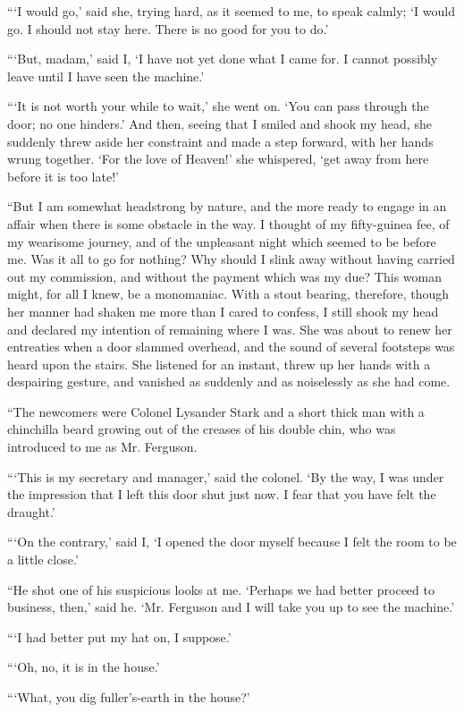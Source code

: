 \documentclass{article}
\begin{document}
```I would go,' said she, trying hard, as it seemed to me, to speak
calmly; `I would go. I should not stay here. There is no good for you
to do.'

```But, madam,' said I, `I have not yet done what I came for. I cannot
possibly leave until I have seen the machine.'

```It is not worth your while to wait,' she went on. `You can pass through
the door; no one hinders.' And then, seeing that I smiled and shook my
head, she suddenly threw aside her constraint and made a step forward,
with her hands wrung together. `For the love of Heaven!' she whispered,
`get away from here before it is too late!'

``But I am somewhat headstrong by nature, and the more ready to engage
in an affair when there is some obstacle in the way. I thought of my
fifty-guinea fee, of my wearisome journey, and of the unpleasant night
which seemed to be before me. Was it all to go for nothing? Why should
I slink away without having carried out my commission, and without
the payment which was my due? This woman might, for all I knew,
be a monomaniac. With a stout bearing, therefore, though her manner
had shaken me more than I cared to confess, I still shook my head and
declared my intention of remaining where I was. She was about to renew
her entreaties when a door slammed overhead, and the sound of several
footsteps was heard upon the stairs. She listened for an instant, threw
up her hands with a despairing gesture, and vanished as suddenly and as
noiselessly as she had come.

``The newcomers were Colonel Lysander Stark and a short thick man with
a chinchilla beard growing out of the creases of his double chin, who
was introduced to me as Mr. Ferguson.

```This is my secretary and manager,' said the colonel. `By the way,
I was under the impression that I left this door shut just now. I fear
that you have felt the draught.'

```On the contrary,' said I, `I opened the door myself because I felt
the room to be a little close.'

``He shot one of his suspicious looks at me. `Perhaps we had better
proceed to business, then,' said he. `Mr. Ferguson and I will take you
up to see the machine.'

```I had better put my hat on, I suppose.'

```Oh, no, it is in the house.'

```What, you dig fuller's-earth in the house?'
\end{document}
